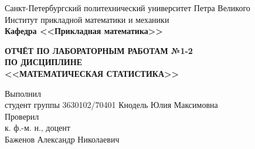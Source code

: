 \begin{titlepage}
\begin{center}
	\begin{large}
		Санкт-Петербургский политехнический университет Петра Великого\\
		Институт прикладной математики и механики\\
		\textbf{Кафедра <<Прикладная математика>>}\\
	\end{large}
	\vfill
	\Large{\textbf{ОТЧЁТ ПО ЛАБОРАТОРНЫМ РАБОТАМ №1-2\\
	ПО ДИСЦИПЛИНЕ \\
	<<МАТЕМАТИЧЕСКАЯ СТАТИСТИКА>>}}
\end{center}
\vfill
\flushleft
Выполнил\\
студент группы 3630102/70401
\flushright
Кнодель Юлия Максимовна\\
\flushleft
Проверил\\
к. ф.-м. н., доцент\\
\flushright
Баженов Александр Николаевич
\vfill
{}
\end{titlepage}